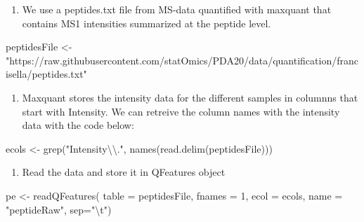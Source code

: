 \documentclass[
]{article}
\newenvironment{Shaded}{\begin{snugshade}}{\end{snugshade}}
\newcommand{\AttributeTok}[1]{\textcolor[rgb]{0.77,0.63,0.00}{#1}}
\newcommand{\DecValTok}[1]{\textcolor[rgb]{0.00,0.00,0.81}{#1}}
\newcommand{\FunctionTok}[1]{\textcolor[rgb]{0.00,0.00,0.00}{#1}}
\newcommand{\NormalTok}[1]{#1}
\newcommand{\OtherTok}[1]{\textcolor[rgb]{0.56,0.35,0.01}{#1}}
\newcommand{\SpecialCharTok}[1]{\textcolor[rgb]{0.00,0.00,0.00}{#1}}
\newcommand{\StringTok}[1]{\textcolor[rgb]{0.31,0.60,0.02}{#1}}
\providecommand{\tightlist}{%
  \setlength{\itemsep}{0pt}\setlength{\parskip}{0pt}}
\begin{document}
\begin{enumerate}
\def\labelenumi{\arabic{enumi}.}
\setcounter{enumi}{1}
\tightlist
\item
  We use a peptides.txt file from MS-data quantified with maxquant that
  contains MS1 intensities summarized at the peptide level.
\end{enumerate}

\begin{Shaded}
\begin{Highlighting}[]
\NormalTok{peptidesFile }\OtherTok{\textless{}{-}} \StringTok{"https://raw.githubusercontent.com/statOmics/PDA20/data/quantification/francisella/peptides.txt"}
\end{Highlighting}
\end{Shaded}

\begin{enumerate}
\def\labelenumi{\arabic{enumi}.}
\setcounter{enumi}{2}
\tightlist
\item
  Maxquant stores the intensity data for the different samples in
  columnns that start with Intensity. We can retreive the column names
  with the intensity data with the code below:
\end{enumerate}

\begin{Shaded}
\begin{Highlighting}[]
\NormalTok{ecols }\OtherTok{\textless{}{-}} \FunctionTok{grep}\NormalTok{(}\StringTok{"Intensity}\SpecialCharTok{\textbackslash{}\textbackslash{}}\StringTok{."}\NormalTok{, }\FunctionTok{names}\NormalTok{(}\FunctionTok{read.delim}\NormalTok{(peptidesFile)))}
\end{Highlighting}
\end{Shaded}

\begin{enumerate}
\def\labelenumi{\arabic{enumi}.}
\setcounter{enumi}{3}
\tightlist
\item
  Read the data and store it in QFeatures object
\end{enumerate}

\begin{Shaded}
\begin{Highlighting}[]
\NormalTok{pe }\OtherTok{\textless{}{-}} \FunctionTok{readQFeatures}\NormalTok{(}
  \AttributeTok{table =}\NormalTok{ peptidesFile,}
  \AttributeTok{fnames =} \DecValTok{1}\NormalTok{,}
  \AttributeTok{ecol =}\NormalTok{ ecols,}
  \AttributeTok{name =} \StringTok{"peptideRaw"}\NormalTok{, }\AttributeTok{sep=}\StringTok{"}\SpecialCharTok{\textbackslash{}t}\StringTok{"}\NormalTok{)}
\end{Highlighting}
\end{Shaded}
\end{document}
